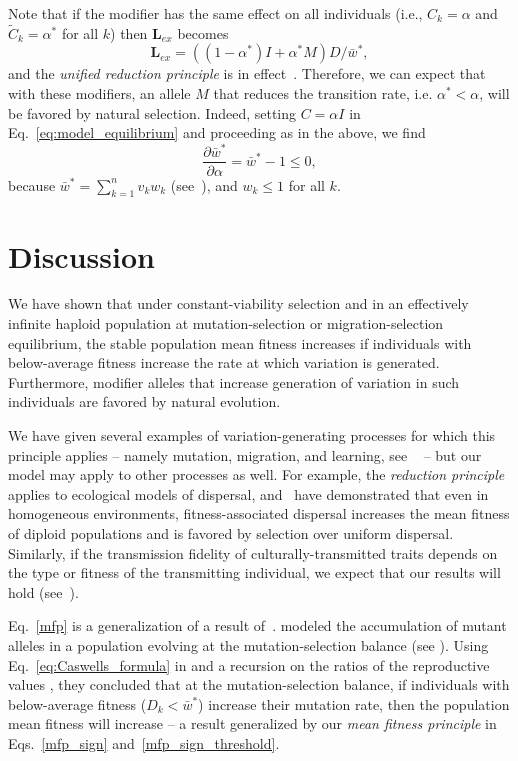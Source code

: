 \documentclass[9pt, a4paper, twocolumn]{extarticle}
\newcommand{\cl}{\mathbf{L}}
\begin{document}
Note that if the modifier has the same effect on all individuals (i.e., $C_k = \alpha$ and $\tilde{C}_k = \alpha^*$ for all $k$) then $\cl_{ex}$ becomes
\begin{equation}
\cl_{ex} = ((1 - \alpha^*)I + \alpha^* M) D /\bar{w}^*,
\end{equation}  
and the \emph{unified reduction principle} is in effect~\cite[eqs. 65, 72]{Altenberg2017}.
Therefore, we can expect that with these modifiers, an allele $M$ that reduces the transition rate, i.e. $\alpha^* < \alpha$, will be favored by natural selection.
Indeed, setting $C = \alpha I$ in Eq.~\ref{eq:model_equilibrium} and proceeding as in the above, we find
$$
\frac{\partial \bar{w}^*}{\partial \alpha} = 
\bar{w}^* - 1 \le 0,
$$
because $\bar{w}^* = \sum_{k=1}^{n}{v_k w_k}$ (see~), and $w_k \le 1$ for all $k$.


\section*{Discussion}

We have shown that under constant-viability selection and in an effectively infinite haploid population at mutation-selection or migration-selection equilibrium, the stable population mean fitness increases if individuals with below-average fitness increase the rate at which variation is generated. Furthermore, modifier alleles that  increase generation of variation in such individuals are favored by natural evolution.

We have given several examples of variation-generating processes for which this principle applies -- namely mutation, migration, and learning, see ~ -- but our model may apply to other processes as well.
For example, the \emph{reduction principle} applies to ecological models of dispersal, and~\citet{Gueijman2013} have demonstrated that even in homogeneous environments, fitness-associated dispersal increases the mean fitness of diploid populations and is favored by selection over uniform dispersal.
Similarly, if the transmission fidelity of culturally-transmitted traits depends on the type or fitness of the transmitting individual, we expect that our results will hold (see~).

Eq.~\ref{mfp} is a generalization of a result of~\citet[Eq.~4]{Ram2012}.
\citeauthor{Ram2012} modeled the accumulation of mutant alleles in a population evolving at the mutation-selection balance (see ).
Using Eq.~\ref{eq:Caswells_formula} in  and a recursion on the ratios of the reproductive values \cite[see][eqs.~A5-6]{Ram2012}, they concluded that at the mutation-selection balance, if individuals with below-average fitness ($D_k < \bar{w}^*$) increase their mutation rate, then the population mean fitness will increase -- a result generalized by our \emph{mean fitness principle} in Eqs.~\ref{mfp_sign} and~\ref{mfp_sign_threshold}.
\end{document}
